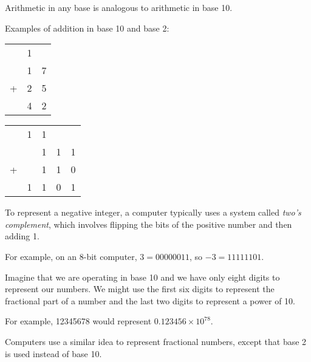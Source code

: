 \documentclass[8pt,a4paper,compress,handout]{beamer}
\begin{document}
\begin{frame}[fragile]
Arithmetic in any base is analogous to arithmetic in base 10.

\bigskip

Examples of addition in base 10 and base 2:
\begin{center}

\begin{tabular}{ccc}
  & 1 &   \\ 
  & 1 & 7 \\
+ & 2 & 5 \\
\hline
  & 4 & 2 \\
\end{tabular}\hspace{2cm} \begin{tabular}{ccccc}
  & 1 & 1 &   \\ 
  &   & 1 & 1 & 1 \\
+ &   & 1 & 1 & 0 \\
\hline
  & 1 & 1 & 0 & 1 \\
\end{tabular}
\end{center}

\bigskip

To represent a negative integer, a computer typically uses a system called \emph{two's complement}, which involves flipping the bits of the positive number and then adding 1. 

\bigskip

For example, on an 8-bit computer, $3 = 00000011$, so $-3 = 11111101$.
\end{frame}

\begin{frame}[fragile]
Imagine that we are operating in base 10 and we have only eight digits to represent our numbers. We might use the first six digits to represent the fractional part of a number and the last two digits to represent a power of 10.  

\bigskip

For example, 12345678 would represent $0.123456 \times 10^{78}$. 

\bigskip

Computers use a similar idea to represent fractional numbers, except that base 2 is used instead of base 10.
\end{frame}
\end{document}
